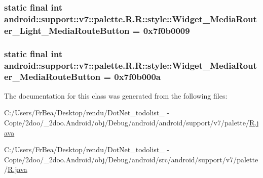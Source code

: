 \hypertarget{classandroid_1_1support_1_1v7_1_1palette_1_1_r_1_1style_6f2c1705941be89e796a0e86d7c8f19c}{
\subsubsection[{Widget\_\-MediaRouter\_\-Light\_\-MediaRouteButton}]{\setlength{\rightskip}{0pt plus 5cm}static final int android::support::v7::palette.R.R::style::Widget\_\-MediaRouter\_\-Light\_\-MediaRouteButton = 0x7f0b0009}}
\label{classandroid_1_1support_1_1v7_1_1palette_1_1_r_1_1style_6f2c1705941be89e796a0e86d7c8f19c}


\hypertarget{classandroid_1_1support_1_1v7_1_1palette_1_1_r_1_1style_bb7854babc10dd1b523528efd504710b}{
\subsubsection[{Widget\_\-MediaRouter\_\-MediaRouteButton}]{\setlength{\rightskip}{0pt plus 5cm}static final int android::support::v7::palette.R.R::style::Widget\_\-MediaRouter\_\-MediaRouteButton = 0x7f0b000a}}
\label{classandroid_1_1support_1_1v7_1_1palette_1_1_r_1_1style_bb7854babc10dd1b523528efd504710b}




The documentation for this class was generated from the following files:\begin{CompactItemize}
\item 
C:/Users/FrBea/Desktop/rendu/DotNet\_\-todolist\_ - Copie/2doo/\_\-2doo.Android/obj/Debug/android/android/support/v7/palette/\hyperlink{android_2support_2v7_2palette_2_r_8java}{R.java}\item 
C:/Users/FrBea/Desktop/rendu/DotNet\_\-todolist\_ - Copie/2doo/\_\-2doo.Android/obj/Debug/android/src/android/support/v7/palette/\hyperlink{src_2android_2support_2v7_2palette_2_r_8java}{R.java}\end{CompactItemize}
